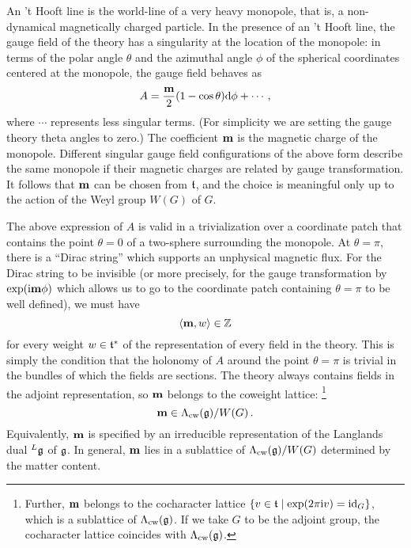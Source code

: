 An 't Hooft line is the world-line of a very heavy monopole, that is, a
non-dynamical magnetically charged particle.  In the presence of an 't
Hooft line, the gauge field of the theory has a singularity at the
location of the monopole: in terms of the polar angle $\theta$ and the
azimuthal angle $\phi$ of the spherical coordinates centered at the
monopole, the gauge field behaves as
\begin{equation}
  \label{eq:monopole}
  A = \frac{\mathbf{m}}{2} (1 - \cos\theta) \mathrm{d}\phi + \dotsb \,,
\end{equation}
where $\dotsb$ represents less singular terms.  (For simplicity we are
setting the gauge theory theta angles to zero.)  The coefficient
$\mathbf{m}$ is the magnetic charge of the monopole.  Different singular
gauge field configurations of the above form describe the same
monopole if their magnetic charges are related by gauge
transformation.  It follows that $\mathbf{m}$ can be chosen from $\mathfrak{t}$,
and the choice is meaningful only up to the action of the Weyl group
$W(G)$ of $G$.

The above expression of $A$ is valid in a trivialization over a
coordinate patch that contains the point $\theta = 0$ of a two-sphere
surrounding the monopole.  At $\theta = \pi$, there is a ``Dirac
string'' which supports an unphysical magnetic flux.  For the Dirac
string to be invisible
(or more precisely, for the gauge transformation by $\exp(\mathrm{i} \mathbf{m} \phi)$
which allows us to go to the coordinate patch containing $\theta=\pi$
to be well defined), we must have
\begin{equation}
  \langle\mathbf{m}, w\rangle \in \mathbb{Z}
\end{equation}
for every weight $w \in \mathfrak{t}^*$ of the representation of every field in
the theory.  This is simply the condition that the holonomy of $A$
around the point $\theta = \pi$ is trivial in the bundles of which the
fields are sections.  The theory always contains fields in the adjoint
representation, so $\mathbf{m}$ belongs to the coweight lattice:%
%
\footnote{Further, $\mathbf{m}$ belongs to the cocharacter lattice
  $\{v \in \mathfrak{t} \mid \exp(2\pi\mathrm{i} v) = \mathop{\mathrm{id}}\nolimits_G\}$, which is a sublattice
  of $\Lambda_{\mathrm{cw}}(\mathfrak{g})$.  If we take $G$ to be the adjoint group, the
  cocharacter lattice coincides with $\Lambda_{\mathrm{cw}}(\mathfrak{g})$.}
%
\begin{equation}
  \mathbf{m} \in \Lambda_{\mathrm{cw}}(\mathfrak{g})/W(G) \,.
\end{equation}
Equivalently, $\mathbf{m}$ is specified by an irreducible representation
of the Langlands dual ${}^L\mathfrak{g}$ of $\mathfrak{g}$.  In general, $\mathbf{m}$ lies
in a sublattice of $\Lambda_{\mathrm{cw}}(\mathfrak{g})/W(G)$ determined by the matter
content.

